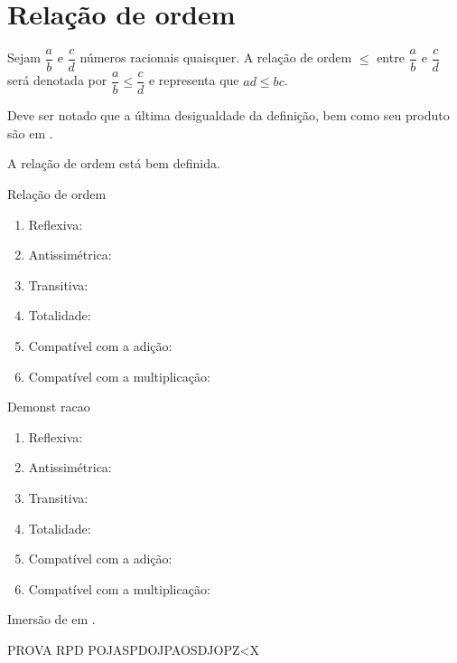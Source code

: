 \documentclass[../main.tex]{subfiles}
\begin{document}
\section{Relação de ordem}
\begin{defi}
    Sejam $\dfrac{a}{b}$ e $\dfrac{c}{d}$ números racionais quaisquer. A relação de ordem $\leq$ entre $\dfrac{a}{b}$ e $\dfrac{c}{d}$ será denotada por $\dfrac{a}{b} \leq \dfrac{c}{d}$ e representa que $ad \leq bc$. 
\end{defi}
\begin{obs}
    Deve ser notado que a última desigualdade da definição, bem como seu produto são em \Z.
\end{obs}
\begin{prop}
    A relação de ordem está bem definida.
\end{prop}
\begin{prop}{Relação de ordem}
    \begin{enumerate}[label=(\roman*)]
        \item Reflexiva:
        \item Antissimétrica:
        \item Transitiva:
        \item Totalidade:
        \item Compatível com a adição:
        \item Compatível com a multiplicação:
    \end{enumerate}
\end{prop}

\begin{dem}
    Demonst   racao 
    \begin{enumerate}[label=(\roman*)]
        \item Reflexiva:
        \item Antissimétrica:
        \item Transitiva:
        \item Totalidade:
        \item Compatível com a adição:
        \item Compatível com a multiplicação:
    \end{enumerate}
\end{dem}

\begin{teo}
    Imersão de \Z em \Q.
\end{teo}
\begin{dem}
    PROVA RPD
    POJASPDOJPAOSDJOPZ<X
\end{dem}
\end{document}

